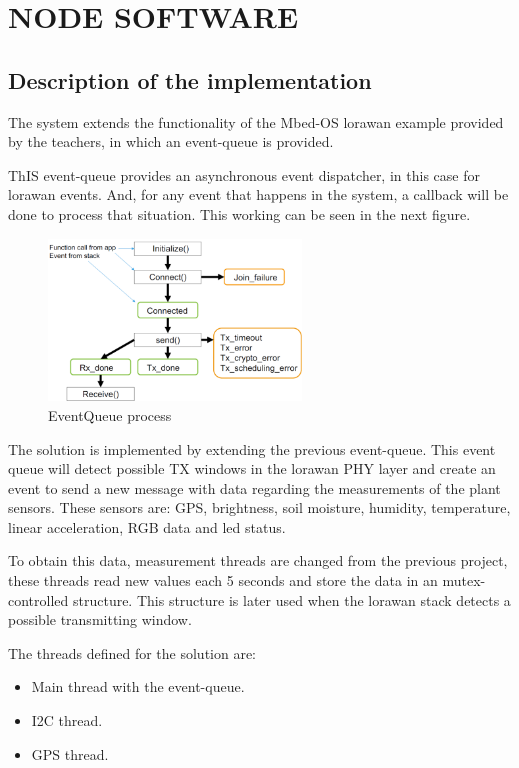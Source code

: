 \section{NODE SOFTWARE}

\subsection{Description of the implementation}

The system extends the functionality of the Mbed-OS \acrshort{lorawan} example provided by the teachers, in which an event-queue is provided.

ThIS event-queue provides an asynchronous event dispatcher, in this case for \acrshort{lorawan} events. And, for any event that happens in the system, a callback will be done to process that situation. This working can be seen in the next figure.

\begin{figure}[H]
    \centering
    \includegraphics[width=0.6\textwidth]{images/4/event-queue.png}
    \caption{EventQueue process\cite{SensorNetworksProject1_slides_2024}}
    \label{fig:events}
\end{figure}

The solution is implemented by extending the previous event-queue. This event queue will detect possible TX windows in the \acrshort{lorawan} PHY layer and create an event to send a new message with data regarding the measurements of the plant sensors. These sensors are: 
GPS, brightness, soil moisture, humidity, temperature, linear acceleration, RGB data and led status.

To obtain this data, measurement threads are changed from the previous project, these threads read new values each 5 seconds and store the data in an mutex-controlled structure. This structure is later used when the \acrshort{lorawan} stack detects a possible transmitting window.

The threads defined for the solution are:
\begin{itemize}
    \item Main thread with the event-queue.
    \item I2C thread.
    \item GPS thread.
\end{itemize}
